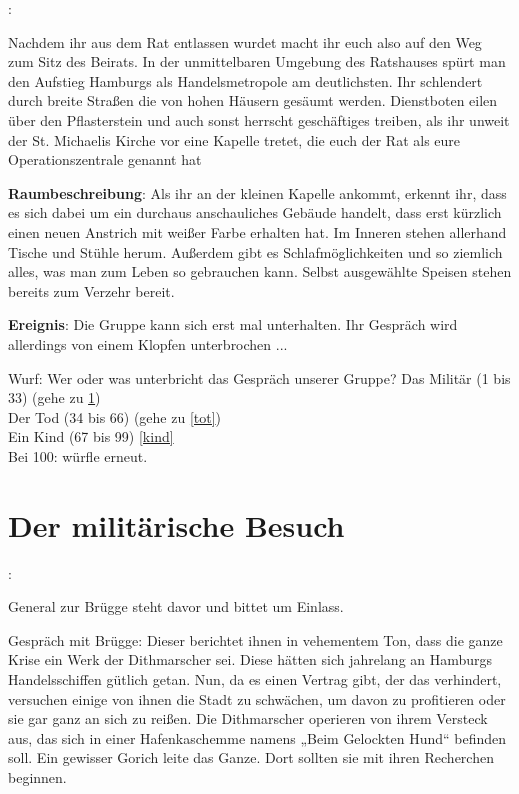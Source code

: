 
:

Nachdem ihr aus dem Rat entlassen wurdet macht ihr euch also auf den Weg zum Sitz des Beirats. In der unmittelbaren Umgebung des Ratshauses spürt man den Aufstieg Hamburgs als Handelsmetropole am deutlichsten. Ihr schlendert durch breite Straßen die von hohen Häusern gesäumt werden. Dienstboten eilen über den Pflasterstein und auch sonst herrscht geschäftiges treiben, als ihr unweit der St. Michaelis Kirche vor eine Kapelle tretet, die euch der Rat als eure Operationszentrale genannt hat

\textbf{Raumbeschreibung}: Als ihr an der kleinen Kapelle ankommt, erkennt ihr, dass es sich dabei um ein durchaus anschauliches Gebäude handelt, dass erst kürzlich einen neuen Anstrich mit weißer Farbe erhalten hat. Im Inneren stehen allerhand Tische und Stühle herum. Außerdem gibt es Schlafmöglichkeiten und so ziemlich alles, was man zum Leben so gebrauchen kann. Selbst ausgewählte Speisen stehen bereits zum Verzehr bereit.

\textbf{Ereignis}: Die Gruppe kann sich erst mal unterhalten. Ihr Gespräch wird allerdings von einem Klopfen unterbrochen ...

\begin{tcolorbox}
  Wurf: Wer oder was unterbricht das Gespräch unserer Gruppe?
  Das Militär (1 bis 33) (gehe zu \ref{militär}) \\
  Der Tod (34 bis 66) (gehe zu \ref{tot}) \\
  Ein Kind (67 bis 99) \ref{kind} \\
  Bei 100: würfle erneut.
\end{tcolorbox}

\section{Der militärische Besuch}
\label{militär}

:

General zur Brügge steht davor und bittet um Einlass.

Gespräch mit Brügge: Dieser berichtet ihnen in vehementem Ton, dass die ganze Krise ein Werk der Dithmarscher sei. Diese hätten sich jahrelang an Hamburgs Handelsschiffen gütlich getan. Nun, da es einen Vertrag gibt, der das verhindert, versuchen einige von ihnen die Stadt zu schwächen, um davon zu profitieren oder sie gar ganz an sich zu reißen. Die Dithmarscher operieren von ihrem Versteck aus, das sich in einer Hafenkaschemme namens „Beim Gelockten Hund“ befinden soll. Ein gewisser Gorich leite das Ganze. Dort sollten sie mit ihren Recherchen beginnen.

